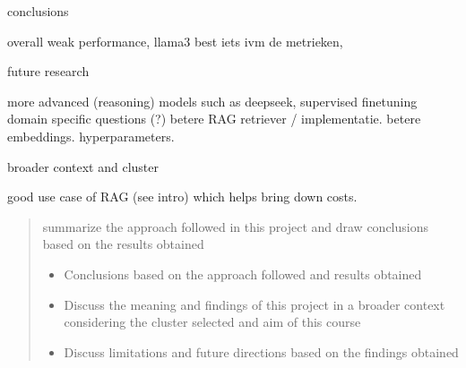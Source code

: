 \documentclass[]{article}
\begin{document}
conclusions

overall weak performance, llama3 best
iets ivm de metrieken,

future research

more advanced (reasoning) models such as deepseek,
supervised finetuning
domain specific questions (?)
betere RAG retriever / implementatie.  betere embeddings.  hyperparameters.

broader context and cluster

good use case of RAG (see intro) which helps bring down costs.


\begin{quotation}
    summarize the approach followed in this project and draw conclusions based on the results obtained
    \begin{itemize}
        \item Conclusions based on the approach followed and results obtained
        \item Discuss the meaning and findings of this project in a broader context considering the cluster selected and aim of this course
        \item Discuss limitations and future directions based on the findings obtained
    \end{itemize}
\end{quotation}

\printbibliography
\end{document}
